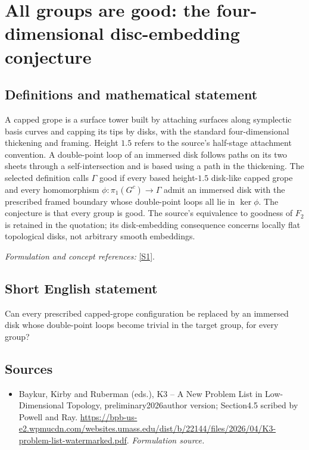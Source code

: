 \documentclass[11pt]{article}
\begin{document}
\section*{\texorpdfstring{All groups are good: the four-dimensional disc-embedding conjecture}{All groups are good: the four-dimensional disc-embedding conjecture}}\label{256}
\subsection{Definitions and mathematical statement}
A capped grope is a surface tower built by attaching surfaces along symplectic basis curves and capping its tips by disks, with the standard four-dimensional thickening and framing. Height $1.5$ refers to the source's half-stage attachment convention. A double-point loop of an immersed disk follows paths on its two sheets through a self-intersection and is based using a path in the thickening. The selected definition calls $\Gamma$ good if every based height-$1.5$ disk-like capped grope and every homomorphism
$\phi:\pi_1(G^c)\to\Gamma$ admit an immersed disk with the prescribed framed boundary whose double-point loops all lie in $\ker\phi$. The conjecture is that every group is good. The source's equivalence to goodness of $F_2$ is retained in the quotation; its disk-embedding consequence concerns locally flat topological disks, not arbitrary smooth embeddings.
\par\smallskip\textit{Formulation and concept references:} \href{https://bpb-us-e2.wpmucdn.com/websites.umass.edu/dist/b/22144/files/2026/04/K3-problem-list-watermarked.pdf}{[S1]}.

\subsection{Short English statement}
Can every prescribed capped-grope configuration be replaced by an immersed disk whose double-point loops become trivial in the target group, for every group?
\subsection{Sources}
\begin{itemize}
\item[S1]Baykur, Kirby and Ruberman (eds.), K3 – A New Problem List in Low-Dimensional Topology, preliminary2026author version; Section4.5 scribed by Powell and Ray.
\url{https://bpb-us-e2.wpmucdn.com/websites.umass.edu/dist/b/22144/files/2026/04/K3-problem-list-watermarked.pdf}.
\textit{Formulation source.}
\end{itemize}
\end{document}
